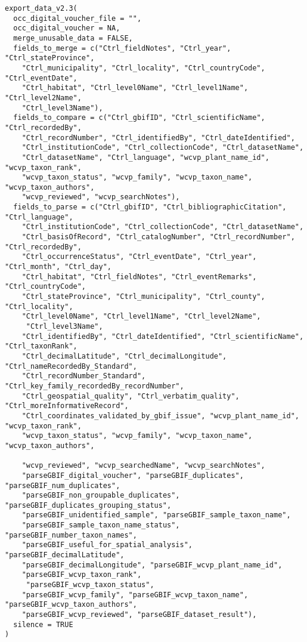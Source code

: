 \documentclass[a4paper]{book}
\begin{document}
\begin{Usage}
\begin{verbatim}
export_data_v2.3(
  occ_digital_voucher_file = "",
  occ_digital_voucher = NA,
  merge_unusable_data = FALSE,
  fields_to_merge = c("Ctrl_fieldNotes", "Ctrl_year", "Ctrl_stateProvince",
    "Ctrl_municipality", "Ctrl_locality", "Ctrl_countryCode", "Ctrl_eventDate",
    "Ctrl_habitat", "Ctrl_level0Name", "Ctrl_level1Name", "Ctrl_level2Name",
    "Ctrl_level3Name"),
  fields_to_compare = c("Ctrl_gbifID", "Ctrl_scientificName", "Ctrl_recordedBy",
    "Ctrl_recordNumber", "Ctrl_identifiedBy", "Ctrl_dateIdentified",
    "Ctrl_institutionCode", "Ctrl_collectionCode", "Ctrl_datasetName",
    "Ctrl_datasetName", "Ctrl_language", "wcvp_plant_name_id", "wcvp_taxon_rank",
    "wcvp_taxon_status", "wcvp_family", "wcvp_taxon_name", "wcvp_taxon_authors",
    "wcvp_reviewed", "wcvp_searchNotes"),
  fields_to_parse = c("Ctrl_gbifID", "Ctrl_bibliographicCitation", "Ctrl_language",
    "Ctrl_institutionCode", "Ctrl_collectionCode", "Ctrl_datasetName",
    "Ctrl_basisOfRecord", "Ctrl_catalogNumber", "Ctrl_recordNumber", "Ctrl_recordedBy",
    "Ctrl_occurrenceStatus", "Ctrl_eventDate", "Ctrl_year", "Ctrl_month", "Ctrl_day",
    "Ctrl_habitat", "Ctrl_fieldNotes", "Ctrl_eventRemarks", "Ctrl_countryCode",
    "Ctrl_stateProvince", "Ctrl_municipality", "Ctrl_county", "Ctrl_locality",
    "Ctrl_level0Name", "Ctrl_level1Name", "Ctrl_level2Name", 
     "Ctrl_level3Name",
    "Ctrl_identifiedBy", "Ctrl_dateIdentified", "Ctrl_scientificName", "Ctrl_taxonRank",
    "Ctrl_decimalLatitude", "Ctrl_decimalLongitude", "Ctrl_nameRecordedBy_Standard",
    "Ctrl_recordNumber_Standard", "Ctrl_key_family_recordedBy_recordNumber",
    "Ctrl_geospatial_quality", "Ctrl_verbatim_quality", "Ctrl_moreInformativeRecord",
    "Ctrl_coordinates_validated_by_gbif_issue", "wcvp_plant_name_id", "wcvp_taxon_rank",
    "wcvp_taxon_status", "wcvp_family", "wcvp_taxon_name", "wcvp_taxon_authors", 
    
    "wcvp_reviewed", "wcvp_searchedName", "wcvp_searchNotes",
    "parseGBIF_digital_voucher", "parseGBIF_duplicates", "parseGBIF_num_duplicates",
    "parseGBIF_non_groupable_duplicates", "parseGBIF_duplicates_grouping_status",
    "parseGBIF_unidentified_sample", "parseGBIF_sample_taxon_name",
    "parseGBIF_sample_taxon_name_status", "parseGBIF_number_taxon_names",
    "parseGBIF_useful_for_spatial_analysis", "parseGBIF_decimalLatitude",
    "parseGBIF_decimalLongitude", "parseGBIF_wcvp_plant_name_id",
    "parseGBIF_wcvp_taxon_rank", 
     "parseGBIF_wcvp_taxon_status",
    "parseGBIF_wcvp_family", "parseGBIF_wcvp_taxon_name", "parseGBIF_wcvp_taxon_authors",
    "parseGBIF_wcvp_reviewed", "parseGBIF_dataset_result"),
  silence = TRUE
)
\end{verbatim}
\end{Usage}
\end{document}
